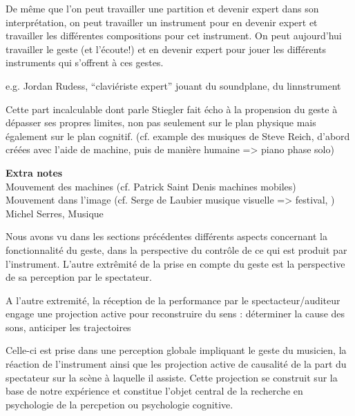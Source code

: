 De même que l'on peut travailler une partition et devenir expert dans son interprétation, on peut travailler un instrument pour en devenir expert et travailler les différentes compositions pour cet instrument. On peut aujourd'hui travailler le geste (et l'écoute!) et en devenir expert pour jouer les différents instruments qui s'offrent à ces gestes.

e.g. Jordan Rudess, ``claviériste expert'' jouant du soundplane, du linnstrument



 Cette part incalculable dont parle Stiegler fait écho à la propension du geste à dépasser ses propres limites, non pas seulement sur le plan physique mais également sur le plan cognitif. (cf. example des musiques de Steve Reich, d'abord créées avec l'aide de machine, puis de manière humaine => piano phase solo)



 
\textbf{Extra notes}\\

Mouvement des machines (cf. Patrick Saint Denis machines mobiles)\\
Mouvement dans l'image (cf. Serge de Laubier musique visuelle => festival, )\\
 Michel Serres, Musique


Nous avons vu dans les sections précédentes différents aspects concernant la fonctionnalité du geste, dans la perspective du contrôle de ce qui est produit par l'instrument. L'autre extrêmité de la prise en compte du geste est la perspective de sa perception par le spectateur. 

A l'autre extremité, la réception de la performance par le spectacteur/auditeur engage une projection active pour reconstruire du sens : déterminer la cause des sons, anticiper les trajectoires

Celle-ci est prise dans une perception globale impliquant le geste du musicien, la réaction de l'instrument ainsi que les projection active de causalité de la part du spectateur sur la scène à laquelle il assiste. Cette projection se construit sur la base de notre expérience et constitue l'objet central de la recherche en psychologie de la percpetion ou psychologie cognitive.

